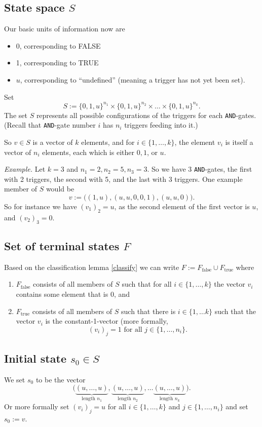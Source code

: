 \documentclass[12pt]{amsart}
\begin{document}
\subsection{State space $S$} 
Our basic units of information now are
\begin{itemize}
\item 0, corresponding to FALSE
\item 1, corresponding to TRUE
\item $u$, corresponding to ``undefined'' (meaning a trigger has 
    not yet been set).
\end{itemize}
Set $$S := \{0,1,u\}^{n_1} \times \{0,1,u\}^{n_2}\times \ldots \times \{0,1,u\}^{n_k}.$$
The set $S$ represents all possible configurations of the triggers for each 
{\tt AND}-gates. (Recall
that {\tt AND}-gate number $i$ has $n_i$ triggers feeding into it.) 

So $v\in S$ is 
a vector of $k$ elements, and for $i\in\{1,\ldots,k\}$, the element $v_i$ 
is itself a vector of $n_i$ elements, each which is either $0,1$, or $u$. 

{\em Example.} Let $k=3$ and $n_1 = 2, n_2 = 5, n_3 = 3$. So we 
have $3$ {\tt AND}-gates, the first with 2 triggers, the second with 5, 
and the last with 3 triggers. One example member of $S$ would be
$$v:=\big((1,u), (u,u,0,0,1), (u, u, 0)\big).$$
So for instance we have $(v_1)_2 = u$, as the second element of 
the first vector is $u$, and $(v_2)_3 = 0$. 

\subsection{Set of terminal states $F$} 
Based on the classification lemma \ref{classify} we can write
$F := F_{\text{false}}\cup F_{\text{true}}$ where
\begin{enumerate}
    \item $F_{\text{false}}$ consists of all members of $S$
        such that for all $i\in\{1,\ldots,k\}$ the vector
        $v_i$ contains some element that is $0$, and
    \item $F_{\text{true}}$ consists of all members of $S$
        such that there is $i\in\{1,\ldots k\}$ such that
        the vector $v_i$ is the constant-1-vector (more formally,
        $$(v_i)_j = 1 \text{ for all } j\in \{1,\ldots, n_i\}.$$
\end{enumerate}

\subsection{Initial state $s_0\in S$} We set $s_0$ to be the
vector $$\big(\underbrace{(u,\ldots, u)}_{\text{length }n_1},
\underbrace{(u,\ldots,u)}_{\text{length }n_2},\ldots 
\underbrace{(u,\ldots, u)}_{\text{length }n_k}\big).$$
Or more formally set $(v_i)_j = u$ for all $i\in\{1,\ldots, k\}$ and 
$j\in\{1,\ldots,n_i\}$ and set $s_0 :=v$.
\end{document}

